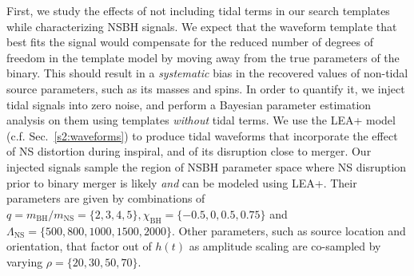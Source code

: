 \documentclass[aps,prd,amsmath,floats,floatfix, twocolumn,
superscriptaddress,nofootinbib,showpacs]{revtex4-1}
\newcommand{\lambdans}{\Lambda_\mathrm{NS}}
\newcommand{\chibh}{\chi_\mathrm{BH}}
\newcommand{\mbh}{m_\mathrm{BH}}
\newcommand{\mns}{m_\mathrm{NS}}
\begin{document}
First, we study the effects of not including tidal terms in our search
templates while characterizing NSBH signals. We expect that the waveform
template that best fits the signal would compensate for the reduced number of
degrees of freedom in the template model by moving away from the true
parameters of the binary. This should result in a {\it systematic} bias in 
the recovered values of non-tidal source parameters, such as its masses 
and spins. In order to quantify it, we inject tidal signals into zero noise,
and perform a Bayesian parameter estimation analysis on them using templates
{\it without} tidal terms.
% 
We use the LEA+ model (c.f. Sec.~\ref{s2:waveforms}) to produce tidal waveforms
that incorporate the effect
of NS distortion during inspiral, and of its disruption close to merger. Our
injected signals sample the region of NSBH parameter space where NS disruption
prior to binary merger is likely {\it and} can be modeled using LEA+. Their
parameters are given by combinations of $q=\mbh/\mns=\{2,3,4,5\},
\chibh=\{-0.5, 0, 0.5, 0.75\}$ and $\lambdans=\{500,800,1000,1500,2000\}$.
Other parameters, such as source location and orientation, that factor out of
$h(t)$ as amplitude scaling are co-sampled by varying $\rho=\{20,30,50,70\}$.
\end{document}
